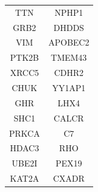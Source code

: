 \documentclass[ppgc, diss, english]{iiufrgs}
\begin{document}
\begin{table}[!bh]
\begin{tabular}{cc}
TTN                                                                                        & NPHP1                                                                                         \\
GRB2                                                                                       & DHDDS                                                                                         \\
VIM                                                                                        & APOBEC2                                                                                       \\
PTK2B                                                                                      & TMEM43                                                                                        \\
XRCC5                                                                                      & CDHR2                                                                                         \\
CHUK                                                                                       & YY1AP1                                                                                        \\
GHR                                                                                        & LHX4                                                                                          \\
SHC1                                                                                       & CALCR                                                                                         \\
PRKCA                                                                                      & C7                                                                                            \\
HDAC3                                                                                      & RHO                                                                                           \\
UBE2I                                                                                      & PEX19                                                                                         \\
KAT2A                                                                                      & CXADR                                                                                         \\

\end{tabular}
\end{table}
\end{document}
